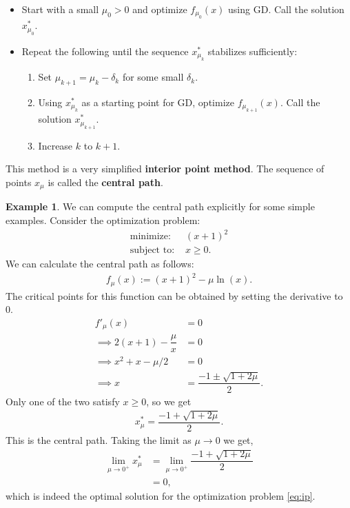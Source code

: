 \documentclass[
]{book}
\providecommand{\tightlist}{%
  \setlength{\itemsep}{0pt}\setlength{\parskip}{0pt}}
\theoremstyle{definition}
\theoremstyle{definition}
\newtheorem{example}{Example}[chapter]
\theoremstyle{definition}
\theoremstyle{definition}
\theoremstyle{remark}
\begin{document}
\begin{itemize}
\tightlist
\item
  Start with a small \(\mu_0 > 0\) and optimize \(f_{\mu_0}(x)\) using GD. Call the solution \(x_{\mu_0}^*\).
\item
  Repeat the following until the sequence \(x_{\mu_k}^*\) stabilizes sufficiently:

  \begin{enumerate}
  \def\labelenumi{\arabic{enumi}.}
  \tightlist
  \item
    Set \(\mu_{k+1} = \mu_k - \delta_k\) for some small \(\delta_k\).
  \item
    Using \(x^*_{\mu_k}\) as a starting point for GD, optimize \(f_{\mu_{k+1}}(x)\). Call the solution \(x_{\mu_{k+1}}^*\).
  \item
    Increase \(k\) to \(k + 1\).
  \end{enumerate}
\end{itemize}

This method is a very simplified \textbf{interior point method}. The sequence of points \(x_{\mu}\) is called the \textbf{central path}.

\begin{example}
\protect\hypertarget{exm:ip-kkt}{}\label{exm:ip-kkt}We can compute the central path explicitly for some simple examples. Consider the optimization problem:
\begin{equation}
  \begin{split}
  \mbox{minimize: } & (x + 1)^2 \\
  \mbox{subject to: } & x \ge 0.
  \end{split}
  \label{eq:ip}
\end{equation}
We can calculate the central path as follows:
\begin{align*}
  f_\mu(x) := (x + 1)^2 - \mu \ln (x).
\end{align*}
The critical points for this function can be obtained by setting the derivative to 0.
\begin{align*}
  f'_\mu(x) &= 0 \\ 
  \implies 2(x + 1) - \dfrac{\mu}{x} &= 0 \\
  \implies x^2 + x - \mu/2 &= 0 \\
  \implies x &= \dfrac{-1 \pm \sqrt{1 + 2 \mu}}{2}.
\end{align*}
Only one of the two satisfy \(x \ge 0\), so we get
\begin{align*}
  x_\mu^* = \dfrac{-1 + \sqrt{1 + 2 \mu}}{2}. 
\end{align*}
This is the central path. Taking the limit as \(\mu \to 0\) we get,
\begin{align*}
  \lim \limits_{\mu \to 0^+} x_\mu^* 
  & = \lim \limits_{\mu \to 0^+} \dfrac{-1 + \sqrt{1 + 2 \mu}}{2} \\ 
  &= 0,
\end{align*}
which is indeed the optimal solution for the optimization problem \eqref{eq:ip}.
\end{example}
\end{document}
